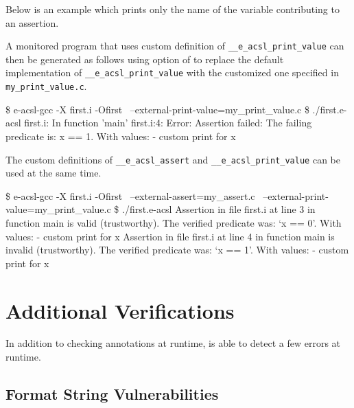 Below is an example which prints only the name of the variable contributing to
an assertion.


A monitored program that uses custom definition of
\texttt{\_\_e\_acsl\_print\_value} can then be
generated as follows using  option of \eacslgcc to
replace the default implementation of \texttt{\_\_e\_acsl\_print\_value}
 with the customized one specified in
\texttt{my\_print\_value.c}.

\begin{logs}
\$ e-acsl-gcc -X first.i -Ofirst \
    --external-print-value=my_print_value.c
\$ ./first.e-acsl
first.i: In function 'main'
first.i:4: Error: Assertion failed:
        The failing predicate is:
        x == 1.
        With values:
        - custom print for x
\end{logs}

The custom definitions of \texttt{\_\_e\_acsl\_assert}
and \texttt{\_\_e\_acsl\_print\_value}\codeidxdef{e\_acsl\_print\_value} can be
used at the same time.

\begin{logs}
\$ e-acsl-gcc -X first.i -Ofirst \
    --external-assert=my_assert.c \
    --external-print-value=my_print_value.c
\$ ./first.e-acsl
Assertion in file first.i at line 3 in function main is valid (trustworthy).
The verified predicate was: `x == 0'.
With values:
        - custom print for x
Assertion in file first.i at line 4 in function main is invalid (trustworthy).
The verified predicate was: `x == 1'.
With values:
        - custom print for x
\end{logs}

\section{Additional Verifications} %

In addition to checking annotations at runtime, \eacsl is able to detect a few
errors at runtime.

\subsection{Format String Vulnerabilities}

